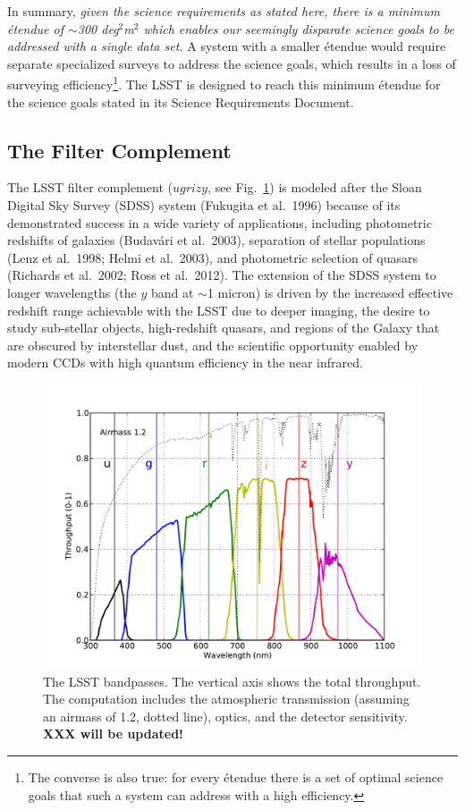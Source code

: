 In summary,
{\it given the science requirements as stated here, there is a
minimum \'etendue of $\sim$300 deg$^2$m$^2$ which enables our seemingly
disparate science goals to be addressed with a single data set.}
A system with a smaller \'etendue would require separate specialized surveys
to address the science goals, which results in a loss of surveying
efficiency\footnote{The converse is also true: for every \'etendue
there is a set of optimal science goals that such a system can
address with a high efficiency.}. The LSST is designed to reach this
minimum \'etendue for the science goals stated in its Science Requirements
Document.



\subsection{  The Filter Complement }

The LSST filter complement ($ugrizy$, see Fig.~\ref{Fig:filters}) is modeled after the Sloan
Digital Sky Survey
(SDSS) system (Fukugita et al.~1996) because of its demonstrated success in a wide
variety of applications, including photometric redshifts of galaxies (Budav\'{a}ri
et al.~2003), separation of stellar populations (Lenz et al.~1998; Helmi et al.~2003),
and photometric selection of quasars (Richards et al.~2002; Ross et al.~2012). The extension of the
SDSS system to longer wavelengths
(the $y$ band at $\sim$1 micron) is driven by the increased effective redshift
range achievable with the LSST due to deeper imaging, the desire to study sub-stellar
objects, high-redshift quasars, and regions of the Galaxy that are obscured by
interstellar dust, and
the scientific opportunity enabled by modern CCDs with high quantum efficiency
in the near infrared.


\begin{figure}
\hskip -0.13in
\includegraphics[width=1.1\hsize,clip]{filters_y4.pdf}
\caption{The LSST bandpasses. The vertical axis shows the total throughput. The computation
includes the atmospheric transmission (assuming an airmass of 1.2, %
dotted line), optics, and the detector sensitivity. {\bf XXX will be updated!}}
\label{Fig:filters}
\end{figure}


